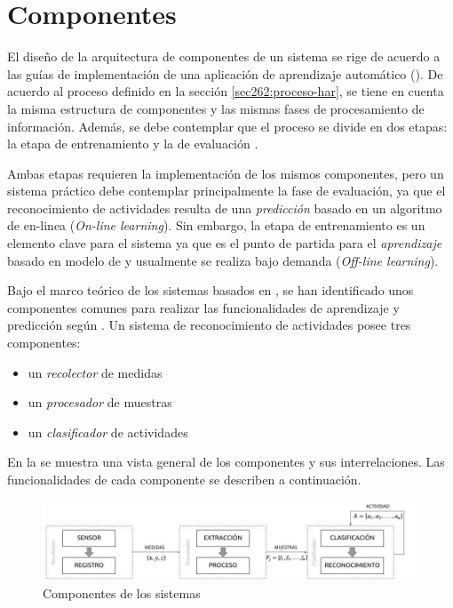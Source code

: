 \section{Componentes}

\label{sec42:componentes}El diseño de la arquitectura de componentes
de un sistema  se rige de acuerdo a las guías de implementación
de una aplicación de aprendizaje automático (). De acuerdo
al proceso definido en la sección \ref{sec262:proceso-har}, se tiene
en cuenta la misma estructura de componentes y las mismas fases de
procesamiento de información. Además, se debe contemplar que el proceso
se divide en dos etapas: la etapa de entrenamiento y la de evaluación
\cite{LaraLabrador2013}. 

Ambas etapas requieren la implementación de los mismos componentes,
pero un sistema  práctico debe contemplar principalmente
la fase de evaluación, ya que el reconocimiento de actividades resulta
de una \emph{predicción} basado en un algoritmo de  en-linea
(\emph{On-line learning}). Sin embargo, la etapa de entrenamiento
es un elemento clave para el sistema ya que es el punto de partida
para el \emph{aprendizaje} basado en modelo de  y usualmente
se realiza bajo demanda (\emph{Off-line learning}).

Bajo el marco teórico de los sistemas  basados en ,
se han identificado unos componentes comunes para realizar las funcionalidades
de aprendizaje y predicción según \cite{Choudhury2008}. Un sistema
de reconocimiento de actividades posee tres componentes:
\begin{itemize}
\item un \emph{recolector }de medidas
\item un\emph{ procesador }de muestras 
\item un \emph{clasificador }de actividades
\end{itemize}
En la  se muestra una vista general
de los componentes y sus interrelaciones. Las funcionalidades de cada
componente se describen a continuación. 

\begin{figure}[!tbph]
\centering{}\includegraphics[width=1\linewidth]{capitulo-4/graphics/diagrama_4_1}\caption[Componentes ]{\label{fig4:componentes-har}Componentes de los sistemas }
\end{figure}


